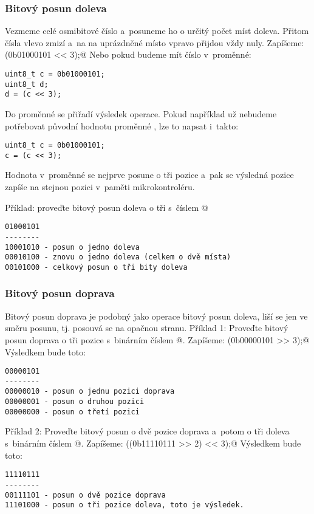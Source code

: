 \subsubsection{Bitový posun doleva} 
Vezmeme celé osmibitové číslo a~posuneme ho o určitý počet míst doleva. 
Přitom čísla vlevo zmizí a~na na uprázdněné místo vpravo přijdou vždy nuly.
Zapíšeme:
\verb@(0b01000101 << 3);@
Nebo pokud budeme mít číslo v~proměnné:
\begin{verbatim}
uint8_t c = 0b01000101;
uint8_t d;
d = (c << 3);
\end{verbatim}
Do proměnné \verb@d@ se přiřadí výsledek operace.
Pokud například už nebudeme potřebovat původní hodnotu proměnné \verb@c@, lze to napsat i~takto:
\begin{verbatim}
uint8_t c = 0b01000101;
c = (c << 3);
\end{verbatim}
Hodnota v~proměnné \verb@c@ se nejprve posune o tři pozice a~pak se výsledná pozice zapíše na stejnou pozici v~paměti mikrokontroléru.

Příklad: proveďte bitový posun doleva o tři s~číslem @

\begin{verbatim}
01000101
--------
10001010 - posun o jedno doleva 
00010100 - znovu o jedno doleva (celkem o dvě místa)
00101000 - celkový posun o tři bity doleva 
\end{verbatim}

\subsubsection{Bitový posun doprava}
Bitový posun doprava je podobný jako operace bitový posun doleva, liší se jen ve směru posunu, tj. posouvá se na opačnou stranu.
Příklad 1: Proveďte bitový posun doprava o tři pozice s~binárním číslem @. Zapíšeme:
\verb@(0b00000101 >> 3);@
Výsledkem bude toto:
\begin{verbatim}
00000101
--------
00000010 - posun o jednu pozici doprava
00000001 - posun o druhou pozici
00000000 - posun o třetí pozici
\end{verbatim}

Příklad 2: Proveďte bitový posun o dvě pozice doprava a~potom o tři doleva s~binárním číslem @. Zapíšeme:
\verb@((0b11110111 >> 2) << 3);@
Výsledkem bude toto:
\begin{verbatim}
11110111
--------
00111101 - posun o dvě pozice doprava
11101000 - posun o tři pozice doleva, toto je výsledek.
\end{verbatim}

